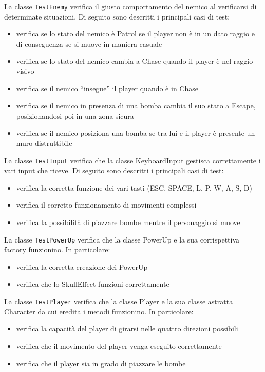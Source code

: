 \documentclass[a4paper,12pt]{report}
\begin{document}
\par
La classe \texttt{TestEnemy} verifica il giusto comportamento del nemico al verificarsi di determinate situazioni. Di seguito sono descritti i principali casi di test:
\begin{itemize}
    \item verifica se lo stato del nemico è Patrol se il player non è in un dato raggio e di conseguenza se si muove in maniera casuale
    \item verifica se lo stato del nemico cambia a Chase quando il player è nel raggio visivo
    \item verifica se il nemico “insegue” il player quando è in Chase
    \item verifica se il nemico in presenza di una bomba cambia il suo stato a Escape, posizionandosi poi in una zona sicura
    \item verifica se il nemico posiziona una bomba se tra lui e il player è presente un muro distruttibile
\end{itemize}

\par
La classe \texttt{TestInput} verifica che la classe KeyboardInput gestisca correttamente i vari input che riceve. Di seguito sono descritti i principali casi di test:
\begin{itemize}
    \item verifica la corretta funzione dei vari tasti (ESC, SPACE, L, P, W, A, S, D)
    \item verifica il corretto funzionamento di movimenti complessi
    \item verifica la possibilità di piazzare bombe mentre il personaggio si muove
\end{itemize}

\par
La classe \texttt{TestPowerUp} verifica che la classe PowerUp e la sua corrispettiva factory funzionino. In particolare:
\begin{itemize}
    \item verifica la corretta creazione dei PowerUp
    \item verifica che lo SkullEffect funzioni correttamente
\end{itemize}

\par
La classe \texttt{TestPlayer} verifica che la classe Player e la sua classe astratta Character da cui eredita i metodi funzionino. In particolare:
\begin{itemize}
    \item verifica la capacità del player di girarsi nelle quattro direzioni possibili
    \item verifica che il movimento del player venga eseguito correttamente
    \item verifica che il player sia in grado di piazzare le bombe
\end{itemize}
\end{document}
